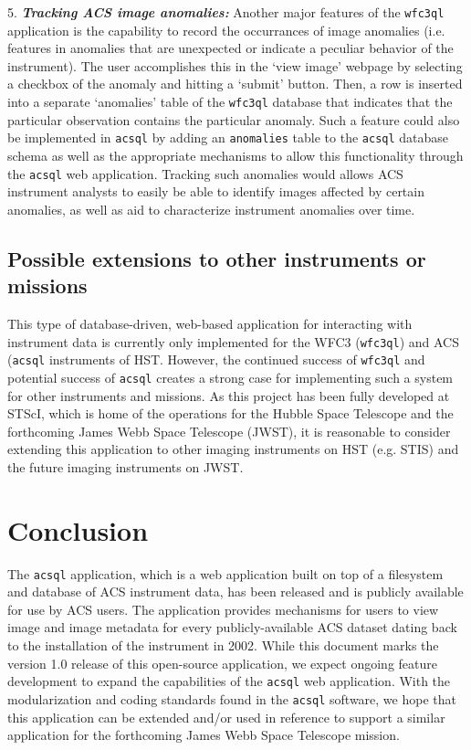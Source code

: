 \documentclass[10pt,journal,compsoc]{IEEEtran}
\begin{document}
5. \textbf{\textit{Tracking ACS image anomalies:}}  Another major features of the \texttt{wfc3ql} application is the capability to record the occurrances of image anomalies (i.e. features in anomalies that
are unexpected or indicate a peculiar behavior of the instrument).  The user accomplishes this in the `view image' webpage by selecting a checkbox of the anomaly and hitting a `submit' button.  Then,
a row is inserted into a separate `anomalies' table of the \texttt{wfc3ql} database that indicates that the particular observation contains the particular anomaly.  Such a feature could also be implemented
in \texttt{acsql} by adding an \texttt{anomalies} table to the \texttt{acsql} database schema as well as the appropriate mechanisms to allow this functionality through the \texttt{acsql} web application.
Tracking such anomalies would allows ACS instrument analysts to easily be able to identify images affected by certain anomalies, as well as aid to characterize instrument anomalies over time.


\subsection{Possible extensions to other instruments or missions} \label{sec5.2}

This type of database-driven, web-based application for interacting with instrument data is currently only implemented for the WFC3 (\texttt{wfc3ql}) and ACS (\texttt{acsql} instruments of HST.  However, the
continued success of \texttt{wfc3ql} and potential success of \texttt{acsql} creates a strong case for implementing such a system for other instruments and missions.  As this project has been fully
developed at STScI, which is home of the operations for the Hubble Space Telescope and the forthcoming James Webb Space Telescope (JWST), it is reasonable to consider extending this application to other imaging
instruments on HST (e.g. STIS) and the future imaging instruments on JWST.


\section{Conclusion} \label{chap6}
The \texttt{acsql} application, which is a web application built on top of a filesystem and database of ACS instrument data, has been released and is publicly available for use by ACS users.  The
application provides mechanisms for users to view image and image metadata for every publicly-available ACS dataset dating back to the installation of the instrument in 2002.  While this document marks
the version 1.0 release of this open-source application, we expect ongoing feature development to expand the capabilities of the \texttt{acsql} web application.  With the modularization and
coding standards found in the \texttt{acsql} software, we hope that this application can be extended and/or used in reference to support a similar application for the forthcoming James Webb Space
Telescope mission.
\end{document}
